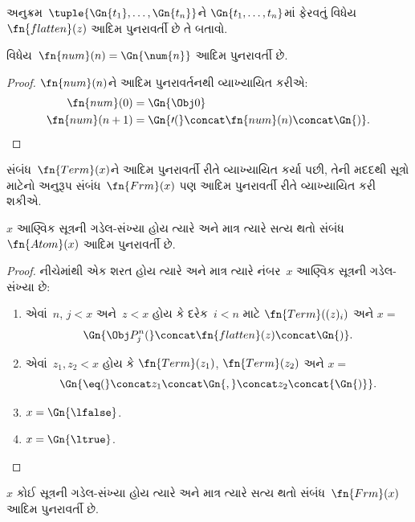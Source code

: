 \begin{prob}
અનુક્રમ~$\tuple{\Gn{t_1}, \dots, \Gn{t_n}}$ને
$\Gn{t_1, \dots, t_n}$માં ફેરવતું
વિધેય~$\fn{flatten}(z)$ આદિમ
પુનરાવર્તી છે તે બતાવો.
\end{prob}

\begin{prop}
  વિધેય~$\fn{num}(n) = \Gn{\num{n}}$ આદિમ પુનરાવર્તી છે.
\end{prop}

\begin{proof}
  $\fn{num}(n)$ને આદિમ પુનરાવર્તનથી વ્યાખ્યાયિત કરીએ:
  \begin{align*}
    \fn{num}(0) & = \Gn{\Obj 0}\\
    \fn{num}(n+1) & = \Gn{\prime(} \concat \fn{num}(n) \concat \Gn{)}.
  \end{align*}
\end{proof}
\endgroup


\begingroup
\makeatletter{}\makeatother

\label{guunit:OLP-0284}


સંબંધ~$\fn{Term}(x)$ને આદિમ
પુનરાવર્તી રીતે વ્યાખ્યાયિત કર્યા પછી,
તેની મદદથી સૂત્રો માટેનો અનુરૂપ
સંબંધ~$\fn{Frm}(x)$ પણ આદિમ
પુનરાવર્તી રીતે વ્યાખ્યાયિત કરી શકીએ.

\begin{prop}
$x$ આણ્વિક સૂત્રની ગડેલ-સંખ્યા
હોય ત્યારે અને માત્ર ત્યારે સત્ય થતો
સંબંધ~$\fn{Atom}(x)$ આદિમ પુનરાવર્તી છે.
\end{prop}

\begin{proof}
નીચેમાંથી એક શરત હોય ત્યારે અને માત્ર
ત્યારે નંબર~$x$ આણ્વિક સૂત્રની
ગડેલ-સંખ્યા છે:
\begin{enumerate}
\item એવાં~$n$, $j < x$ અને~$z < x$
  હોય કે દરેક~$i < n$ માટે
  $\fn{Term}((z)_i)$ અને $x = $
\[
\Gn{\Obj P^n_j(} \concat \fn{flatten}(z) \concat \Gn{)}.
\]
\item એવાં~$z_1, z_2 < x$ હોય કે
  $\fn{Term}(z_1)$, $\fn{Term}(z_2)$
  અને $x = $
\[
\Gn{{\eq}(} \concat z_1 \concat \Gn{,} \concat z_2 \concat{\Gn{)}}.
\]
  \item $x = \Gn{\lfalse}$.
  \item $x = \Gn{\ltrue}$.
\end{enumerate}
\end{proof}

\begin{prop}
$x$ કોઈ સૂત્રની ગડેલ-સંખ્યા
હોય ત્યારે અને માત્ર ત્યારે સત્ય થતો
સંબંધ~$\fn{Frm}(x)$ આદિમ પુનરાવર્તી છે.
\end{prop}

